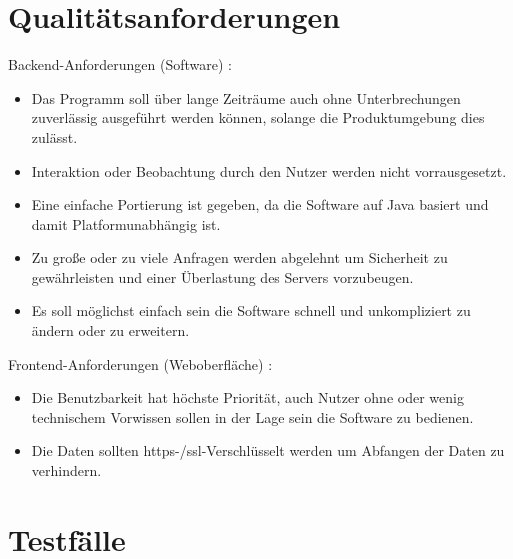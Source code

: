 \documentclass[a4paper, 12 pt]{article}
\begin{document}
	\section{Qualitätsanforderungen}
	Backend-Anforderungen (Software) :
	\begin{itemize}
	\item Das Programm soll über lange Zeiträume auch ohne Unterbrechungen zuverlässig ausgeführt werden können, solange die Produktumgebung dies zulässt.
	\item Interaktion oder Beobachtung durch den Nutzer werden nicht vorrausgesetzt.
	\item Eine einfache Portierung ist gegeben, da die Software auf Java basiert und damit Platformunabhängig ist. 
	\item Zu große oder zu viele Anfragen werden abgelehnt um Sicherheit zu gewährleisten und einer Überlastung des Servers vorzubeugen.
	\item Es soll möglichst einfach sein die Software schnell und unkompliziert zu ändern oder zu erweitern.
	\end{itemize}
	Frontend-Anforderungen (Weboberfläche) :
	\begin{itemize}
	\item Die Benutzbarkeit hat höchste Priorität, auch Nutzer ohne oder wenig technischem Vorwissen sollen in der Lage sein die Software zu bedienen.
	\item Die Daten sollten \gls{https}-/\gls{ssl}-Verschlüsselt werden um Abfangen der Daten zu verhindern.
	\end{itemize}
	

	\section{Testfälle}
	

	
	
\end{document}
